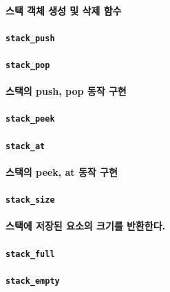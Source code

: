 \documentclass[UTF8]{report}
\begin{document}
            \paragraph{%
                \normalfont 스택 객체 생성 및 삭제 함수
            }

            \paragraph{\texttt{stack\_push}}
            \paragraph{\texttt{stack\_pop}}
            \paragraph{%
                \normalfont 스택의 push, pop 동작 구현
            }

            \paragraph{\texttt{stack\_peek}}
            \paragraph{\texttt{stack\_at}}
            \paragraph{%
                \normalfont 스택의 peek, at 동작 구현
            }

            \paragraph{\texttt{stack\_size}}
            \paragraph{%
                \normalfont 스택에 저장된 요소의 크기를 반환한다.
            }

            \paragraph{\texttt{stack\_full}}
            \paragraph{\texttt{stack\_empty}}
\end{document}
